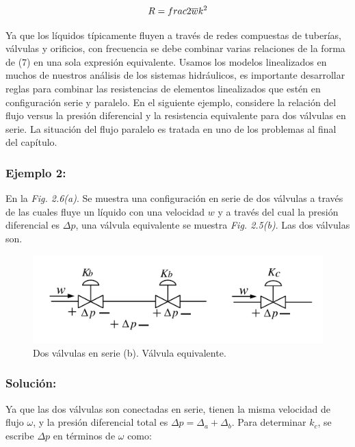 \documentclass[a4paper,12pt,twoside]{proyectotanquesecci}
\begin{document}
\begin{equation}
R=\\frac{2\overline{w}}{k^{2}}
\end{equation}

Ya que los líquidos típicamente fluyen a través de redes compuestas de tuberías, válvulas y orificios, con frecuencia se debe combinar varias relaciones de la forma de (7) en una sola expresión equivalente. Usamos los modelos linealizados en muchos de nuestros análisis de los sistemas hidráulicos, es importante desarrollar reglas para combinar las resistencias de elementos linealizados que estén en configuración serie y paralelo. En el siguiente ejemplo, considere la relación del flujo versus la presión diferencial y la resistencia equivalente para dos válvulas en serie. La situación del flujo paralelo es tratada en uno de los problemas al final del capítulo. \\

\subsubsection{Ejemplo 2:}

En la \textit{Fig. 2.6(a)}. Se muestra una configuración en serie de dos válvulas a través de las cuales fluye un líquido con una velocidad $w$ y a través del cual la presión diferencial es ${\Delta p}$, una válvula equivalente se muestra \textit{Fig. 2.5(b)}. Las dos válvulas son.

\begin{figure}[h]
\centering
\includegraphics[scale=0.5]{Figura6}
\renewcommand{\figurename}{Fig.}
\caption{Dos válvulas en serie (b). Válvula equivalente.}
\label{Dos válvulas en serie (b). Válvula equivalente.}
\end{figure}

\subsubsection{Solución:}

Ya que las dos válvulas son conectadas en serie, tienen la misma velocidad de flujo $\omega$, y la presión diferencial total es $\Delta p = \Delta_{a}+\Delta_{b}$. Para determinar $k_{c}$, se escribe $\Delta p$ en términos de $\omega$ como:
\end{document}
